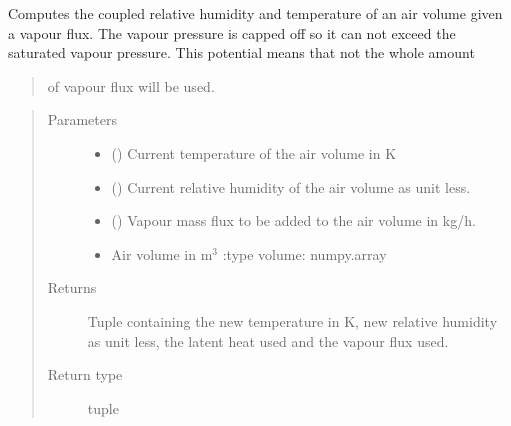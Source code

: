 \documentclass[letterpaper,10pt,english]{sphinxmanual}
\begin{document}

\begin{fulllineitems}
\label{\detokenize{air:livestock.air.compute_temperature_relative_humidity}}
Computes the coupled relative humidity and temperature of an air volume given a vapour flux. The vapour pressure is
capped off so it can not exceed the saturated vapour pressure. This potential means that not the whole amount
\begin{quote}

of vapour flux will be used.
\end{quote}
\begin{quote}\begin{description}
\item[{Parameters}] \leavevmode\begin{itemize}
\item {} 
 () \textendash{} Current temperature of the air volume in K

\item {} 
 () \textendash{} Current relative humidity of the air volume as unit less.

\item {} 
 () \textendash{} Vapour mass flux to be added to the air volume in kg/h.

\item {} 
 \textendash{} Air volume in m$^{\text{3}}$    :type volume: numpy.array

\end{itemize}

\item[{Returns}] \leavevmode
Tuple containing the new temperature in K, new relative humidity as unit less, the latent heat used and
the vapour flux used.

\item[{Return type}] \leavevmode
tuple

\end{description}\end{quote}

\end{fulllineitems}
\end{document}
